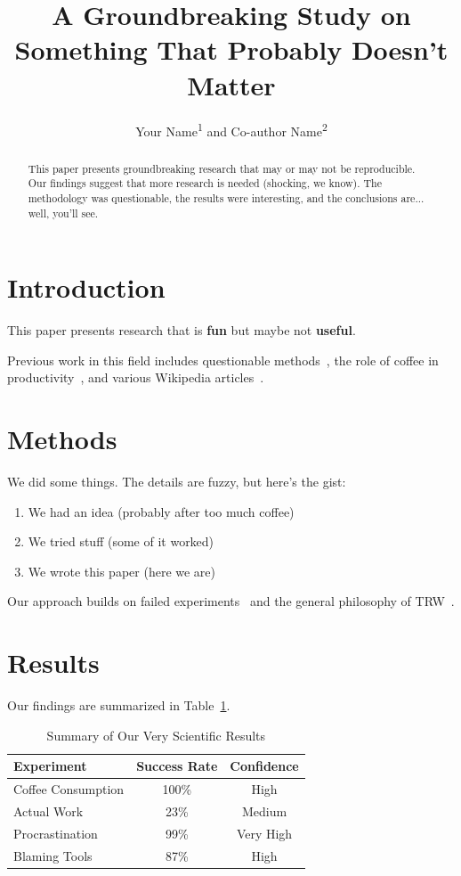 \documentclass{trw}
\title{A Groundbreaking Study on Something That Probably Doesn't Matter}
\author{Your Name\textsuperscript{1} and Co-author Name\textsuperscript{2}}
\affiliation{\textsuperscript{1}Your University \quad \textsuperscript{2}Another Place}
\begin{document}
\maketitle

\begin{abstract}
This paper presents groundbreaking research that may or may not be reproducible.
Our findings suggest that more research is needed (shocking, we know).
The methodology was questionable, the results were interesting, and the conclusions are... well, you'll see.
\end{abstract}

\section{Introduction}

This paper presents research that is \textbf{fun} but maybe not \textbf{useful}. 

Previous work in this field includes questionable methods~\cite{smith2024questionable}, the role of coffee in productivity~\cite{johnson2023coffee}, and various Wikipedia articles~\cite{wikipedia2024}.

\section{Methods}

We did some things. The details are fuzzy, but here's the gist:

\begin{enumerate}
    \item We had an idea (probably after too much coffee)~\cite{johnson2023coffee}
    \item We tried stuff (some of it worked)
    \item We wrote this paper (here we are)
\end{enumerate}

Our approach builds on failed experiments~\cite{brown2022failed} and the general philosophy of TRW~\cite{trw2026}.

\section{Results}

Our findings are summarized in Table~\ref{tab:results}.

\begin{table}[H]
\centering
\caption{Summary of Our Very Scientific Results}
\label{tab:results}
\begin{tabular}{lcc}
\toprule
\textbf{Experiment} & \textbf{Success Rate} & \textbf{Confidence} \\
\midrule
Coffee Consumption    & 100\% & High \\
Actual Work          & 23\%  & Medium \\
Procrastination      & 99\%  & Very High \\
Blaming Tools        & 87\%  & High \\
\bottomrule
\end{tabular}
\end{table}
\end{document}
